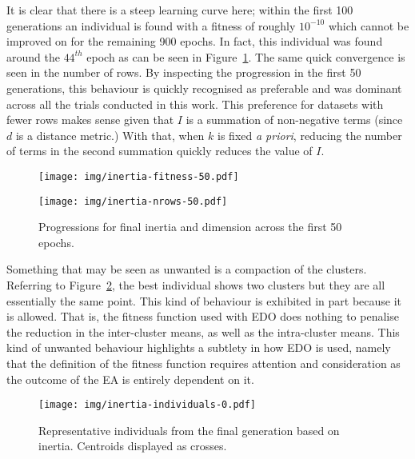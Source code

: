 It is clear that there is a steep learning curve here; within the first 100
generations an individual is found with a fitness of roughly \(10^{-10}\) which
cannot be improved on for the remaining 900 epochs. In fact, this individual was
found around the \(44^{th}\) epoch as can be seen in
Figure~\ref{figure:inertia-50}. The same quick convergence is seen in the number
of rows. By inspecting the progression in the first 50 generations, this
behaviour is quickly recognised as preferable and was dominant across all the
trials conducted in this work. This preference for datasets with fewer rows
makes sense given that \(I\) is a summation of non-negative terms (since \(d\)
is a distance metric.) With that, when \(k\) is fixed \textit{a priori},
reducing the number of terms in the second summation quickly reduces the value
of \(I\). 

\begin{figure}[htbp]
    \centering
    \begin{minipage}{\imgwidth}
        \centering
        \texttt{[image: img/inertia-fitness-50.pdf]}
    \end{minipage}

    \begin{minipage}{\imgwidth}
        \centering
        \texttt{[image: img/inertia-nrows-50.pdf]}
    \end{minipage}
    \caption{Progressions for final inertia and dimension across the first 50
             epochs.}\label{figure:inertia-50}
\end{figure}

Something that may be seen as unwanted is a compaction of the clusters.
Referring to Figure~\ref{figure:inertia-individuals}, the best individual shows
two clusters but they are all essentially the same point. This kind of behaviour
is exhibited in part because it is allowed. That is, the fitness function used
with EDO does nothing to penalise the reduction in the inter-cluster means, as
well as the intra-cluster means. This kind of unwanted behaviour highlights a
subtlety in how EDO is used, namely that the definition of the fitness function
requires attention and consideration as the outcome of the EA is entirely
dependent on it.

\begin{figure}[htbp]
    \centering
    \texttt{[image: img/inertia-individuals-0.pdf]}
    \caption{Representative individuals from the final generation based on
             inertia. Centroids displayed as
             crosses.}\label{figure:inertia-individuals}
\end{figure}


